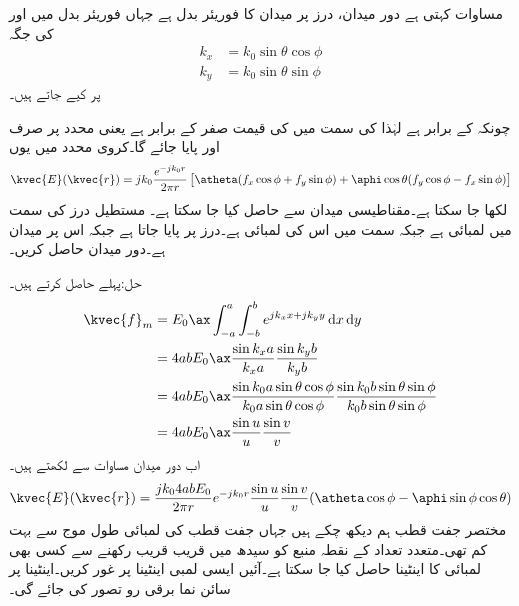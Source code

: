 مساوات  کہتی ہے دور میدان، درز پر میدان کا فوریئر بدل ہے جہاں فوریئر بدل میں  اور  کی جگہ  
\begin{align*}
k_x&=k_0\sin\theta\cos\phi \\
k_y&=k_0\sin\theta\sin\phi
\end{align*}
 پر کیے جاتے ہیں۔

چونکہ  کے برابر ہے لہٰذا  کی سمت میں  کی قیمت صفر کے برابر ہے یعنی  محدد پر صرف  اور  پایا جائے گا۔کروی محدد میں یوں
\begin{align}\label{مساوات_اینٹینا_دور_میدان_بذریعہ_فوریئر_بدل}
\kvec{E}(\kvec{r})=j k_0 \frac{e^{-j k_0 r}}{2\pi r}\left[\atheta (f_x \cos\phi+f_y \sin\phi)+\aphi \cos \theta (f_y\cos\phi-f_x\sin\phi) \right]
\end{align}
لکھا جا سکتا ہے۔مقناطیسی میدان  سے حاصل کیا جا سکتا ہے۔
مستطیل درز کی  سمت میں لمبائی  ہے جبکہ  سمت میں اس کی لمبائی  ہے۔درز  پر پایا جاتا  ہے جبکہ اس پر
 میدان  ہے۔دور میدان حاصل کریں۔

حل:پہلے  حاصل کرتے ہیں۔
\begin{align*}
\kvec{f}_m&=E_0 \ax \int_{-a}^{a}\int_{-b}^{b} e^{j k_x x +j k_y y} \dif x \dif y\\
&=4 a b E_0 \ax \frac{\sin k_x a}{k_x a}\frac{\sin k_y b}{k_y b}\\
&=4 a b E_0 \ax \frac{\sin k_0 a \sin \theta \cos \phi}{k_0 a\sin \theta \cos \phi}\frac{\sin k_0 b \sin \theta \sin\phi}{k_0 b\sin\theta\sin\phi}\\
&=4 a b E_0 \ax \frac{\sin u}{u} \frac{\sin v}{v}
\end{align*}
اب دور میدان مساوات  سے لکھتے ہیں۔
\begin{align*}
\kvec{E}(\kvec{r})=\frac{j k_0 4 a bE_0}{2\pi r}e^{-j k_0 r}\frac{\sin u}{u}\frac{\sin v}{v} (\atheta \cos\phi-\aphi \sin\phi\cos\theta)
\end{align*}
مختصر جفت قطب ہم دیکھ چکے ہیں جہاں جفت قطب کی لمبائی طول موج سے بہت کم  تھی۔متعدد تعداد کے نقطہ منبع کو سیدھ میں قریب قریب رکھنے سے کسی بھی لمبائی کا اینٹینا حاصل کیا جا سکتا ہے۔آئیں ایسی لمبی اینٹینا پر غور کریں۔اینٹینا پر سائن نما برقی رو تصور کی جائے گی۔

